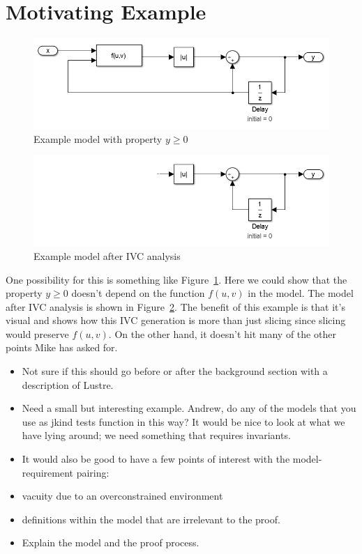 \section{Motivating Example}
\label{sec:exmpl}

\begin{figure}
\includegraphics[width=\columnwidth]{figs/simulink.png}
\caption{Example model with property $y \geq 0$}
\label{fig:example}
\end{figure}

\begin{figure}
\includegraphics[width=\columnwidth]{figs/simulink-ivc.png}
\caption{Example model after IVC analysis}
\label{fig:example-ivc}
\end{figure}

One possibility for this is something like Figure~\ref{fig:example}.
Here we could show that the property $y \geq 0$ doesn't depend on the
function $f(u,v)$ in the model. The model after IVC analysis is shown
in Figure~\ref{fig:example-ivc}. The benefit of this example is that
it's visual and shows how this IVC generation is more than just
slicing since slicing would preserve $f(u,v)$. On the other hand, it
doesn't hit many of the other points Mike has asked for.

\begin{itemize}
    \item Not sure if this should go before or after the background section with a description of Lustre.
    \item Need a small but interesting example.  Andrew, do any of the models that you use as jkind tests
        function in this way?  It would be nice to look at what we have lying around; we need something 
        that requires invariants.
    \item It would also be good to have a few points of interest with the model-requirement pairing: 
    \item \quad   vacuity due to an overconstrained environment 
    \item \quad   definitions within the model that are irrelevant to the proof.
    \item Explain the model and the proof process.
\end{itemize}
